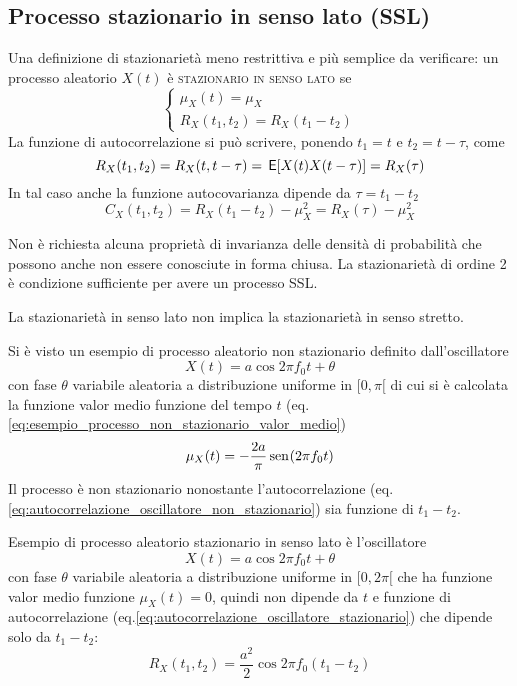 \subsection{Processo stazionario in senso lato (SSL)}
Una definizione di stazionarietà meno restrittiva e più semplice da verificare: un processo aleatorio $X(t)$ è \textsc{stazionario in senso lato} se
\begin{equation}
\label{eq:processo_stazionario_senso_lato}
	\begin{cases}
		\mu_X(t)=\mu_X\\
		R_X(t_1,t_2)=R_X(t_1-t_2)
	\end{cases}
\end{equation}
La funzione di autocorrelazione si può scrivere, ponendo $t_1=t$ e $t_2=t-\tau$, come
\begin{equation}
	R_X(t_1,t_2)=R_X(t,t-\tau)=\,{\operatorname{\mathsf{E}}}\!\left[{X(t)X(t-\tau)}\right]=R_X(\tau)
\end{equation}
In tal caso anche la funzione autocovarianza dipende da $\tau=t_1-t_2$
\begin{equation}
	C_X(t_1,t_2)=R_X(t_1-t_2)-\mu^2_X=R_X(\tau)-\mu^2_X
\end{equation}

Non è richiesta alcuna proprietà di invarianza delle densità di probabilità che possono anche non essere conosciute in forma chiusa.
La stazionarietà di ordine 2 è condizione sufficiente per avere un processo SSL.
\begin{nota}
	La stazionarietà in senso lato non implica la stazionarietà in senso stretto.
\end{nota}
\begin{esempio}
Si è visto un esempio di processo aleatorio non stazionario definito dall'oscillatore
\[
	X(t)=a\cos{2\pi f_0 t+\theta}
\]
con fase $\theta$ variabile aleatoria a distribuzione uniforme in $[0,\pi[$
di cui si è calcolata la funzione valor medio funzione del tempo $t$ (eq.\ref{eq:esempio_processo_non_stazionario_valor_medio})
\[
	\mu_X(t)=-\frac{2a}{\pi}\,{\operatorname{sen}}^{}\!\left({2\pi f_0 t}\right)
\]
Il processo è non stazionario nonostante l'autocorrelazione (eq.\ref{eq:autocorrelazione_oscillatore_non_stazionario}) sia funzione di $t_1-t_2$.
\end{esempio}

\begin{esempio}
\label{es:oscillatore_stazionario_senso_lato}
Esempio di processo aleatorio stazionario in senso lato è l'oscillatore
\[
	X(t)=a\cos{2\pi f_0 t+\theta}
\]
con fase $\theta$ variabile aleatoria a distribuzione uniforme in $[0,2\pi[$
che ha funzione valor medio funzione $\mu_X(t)=0$, quindi non dipende da $t$ e funzione di autocorrelazione (eq.\ref{eq:autocorrelazione_oscillatore_stazionario}) che dipende solo da $t_1-t_2$:
\[
	R_X(t_1,t_2)=\frac{a^2}{2}\cos{2\pi f_0(t_1-t_2)}
\]
\end{esempio}

